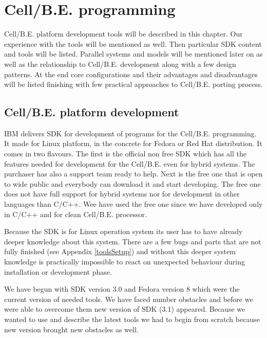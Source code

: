 ﻿\chapter {Cell/B.E. programming}
\par
Cell/B.E. platform development tools will be described in this chapter.
Our experience with the tools will be mentioned as well.
Then particular SDK content and tools will be listed.
Parallel systems and models will be mentioned later on as well as the relationship to Cell/B.E. development along with a few design patterns.
At the end core configurations and their advantages and disadvantages will be listed finishing with few practical approaches to Cell/B.E. porting process.

\section{Cell/B.E. platform development}
\par
IBM delivers SDK for development of programs for the Cell/B.E. programming.
It made for Linux platform, in the concrete for Fedora or Red Hat distribution.
It comes in two flavours.
The first is the official non free SDK which has all the features needed for development for the Cell/B.E. even for hybrid systems.
The purchaser has also a support team ready to help.
Next is the free one that is open to wide public and everybody can download it and start developing.
The free one does not have full support for hybrid systems nor for development in other languages than C/C++.
Wee have used the free one since we have developed only in C/C++ and for clean Cell/B.E. processor.

\par
Because the SDK is for Linux operation system its user has to have already deeper knowledge about this system.
There are a few bugs and parts that are not fully finished (see Appendix \ref{toolsSetup}) and without this deeper system knowledge is practically impossible to react on unexpected behaviour during installation or development phase.

\par
We have begun with SDK version 3.0 and Fedora version 8 which were the current version of needed tools.
We have faced number obstacles and before we were able to overcome them new version of SDK (3.1) appeared.
Because we wanted to use and describe the latest tools we had to begin from scratch because new version brought new obstacles as well.

